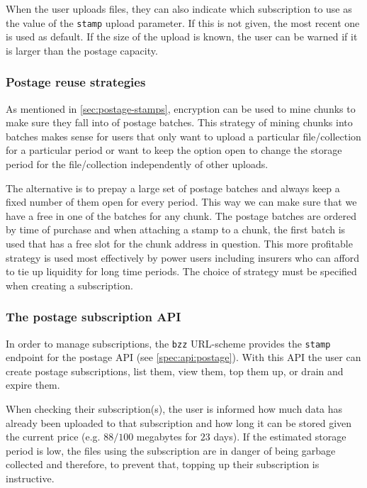 When the user uploads files, they can also indicate which subscription to use as the value of the \lstinline{stamp} upload parameter. If this is not given, the most recent one is used as default. If the size of the upload is known, the user can be warned if it is larger than the postage capacity. 

\subsubsection{Postage reuse strategies}

As mentioned in \ref{sec:postage-stamps}, encryption can be used to mine chunks to make sure they fall into  of postage batches. This strategy of mining chunks into batches makes sense for users that only want to upload a particular file/collection for a particular period or want to keep the option open to change the storage period for the file/collection independently of other uploads.

The alternative is to prepay a large set of postage batches and always keep a fixed number of them open for every period. This way we can make sure that we have a free  in one of the batches for any chunk. The postage batches are ordered by time of purchase and when attaching a stamp to a chunk, the first batch is used that has a free slot for the chunk address in question. This more profitable strategy is used most effectively by power users including insurers who can afford to tie up liquidity for long time periods. The choice of strategy must be specified when creating a subscription.

\subsubsection{The postage subscription API}

In order to manage subscriptions, the \lstinline{bzz} URL-scheme provides the \lstinline{stamp} endpoint for the postage API (see \ref{spec:api:postage}). With this API the user can create postage subscriptions, list them, view them, top them up, or drain and expire them. 

When checking their subscription(s), the user is informed how much data has already been uploaded to that subscription and how long it can be stored given the current price (e.g. $88/100$ megabytes for $23$ days). If the estimated storage period is low, the files using the subscription are in danger of being garbage collected and therefore, to prevent that, topping up their subscription is instructive.


